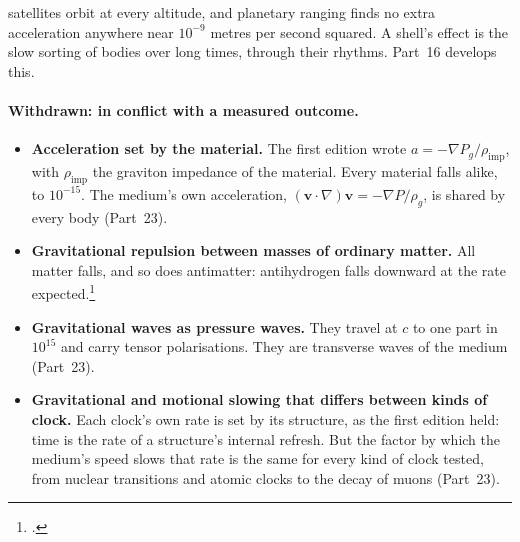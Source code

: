 \documentclass[11pt,a4paper]{article}
\newcommand{\fn}[1]{\footnote{\citealp{#1}.}}
\begin{document}
 satellites orbit at every altitude, and planetary ranging finds no extra acceleration anywhere near $10^{-9}$ metres per second squared. A shell's effect is the slow sorting of bodies over long times, through their rhythms.  Part~16 develops this.

\paragraph{Withdrawn: in conflict with a measured outcome.}
\begin{itemize}
\item \textbf{Acceleration set by the material.} The first edition wrote $a = -\nabla P_g/\rho_{\text{imp}}$, with $\rho_{\text{imp}}$ the graviton impedance of the material. Every material falls alike, to $10^{-15}$. The medium's own acceleration, $(\mathbf{v}\cdot\nabla)\mathbf{v} = -\nabla P/\rho_g$, is shared by every body (Part~23).
\item \textbf{Gravitational repulsion between masses of ordinary matter.} All matter falls, and so does antimatter: antihydrogen falls downward at the rate expected.\fn{alphag2023}
\item \textbf{Gravitational waves as pressure waves.} They travel at $c$ to one part in $10^{15}$ and carry tensor polarisations. They are transverse waves of the medium (Part~23).
\item \textbf{Gravitational and motional slowing that differs between kinds of clock.} Each clock's own rate is set by its structure, as the first edition held: time is the rate of a structure's internal refresh. But the factor by which the medium's speed slows that rate is the same for every kind of clock tested, from nuclear transitions and atomic clocks to the decay of muons (Part~23).
\end{itemize}
\end{document}
